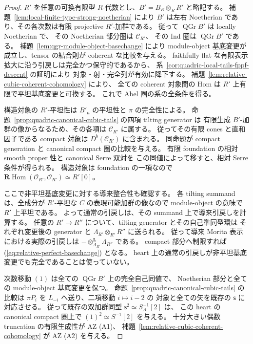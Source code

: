 \begin{proof}
$R'$ を任意の可換有限型 $R$-代数とし、$B'=B_R\otimes_RR'$ と略記する。
補題~\ref{lem:local-finite-type-strong-noetherian} により
$B'$ は左右 Noetherian であり、その各次数は有限 projective $R'$-加群である。
従って $\operatorname{QGr}B'$ は locally Noetherian で、
その Noetherian 部分圏は $\mathcal C_{R'}$、
その Ind 圏は $\operatorname{QGr}B'$ である。
補題~\ref{lem:qgr-module-object-basechange} により
module-object 基底変更が成立し、tensor の結合則が coherent な比較を与える。
faithfully flat な有限表示拡大に沿う引戻しは完全かつ保守的であるから、
系~\ref{cor:quadric-local-tails-fppf-descent} の証明により
対象・射・完全列が有効に降下する。
補題~\ref{lem:relative-cubic-coherent-cohomology} により、
全ての coherent 対象間の Hom は $R'$ 上有限で平坦基底変更と可換する。
これで Abel 圏の系の全条件を得る。

構造対象の $R'$-平坦性は $B'_n$ の平坦性と $\pi$ の完全性による。
命題~\ref{prop:quadric-canonical-cubic-tails} の四項 tilting generator は
有限生成 $B'$-加群の像からなるため、その各項は $\mathcal C_{R'}$ に属する。
従ってその有限 cones と直和因子である compact 対象は
$D^b(\mathcal C_{R'})$ に含まれる。
同命題が compact generation と canonical compact 圏の比較を与える。
有限 foundation の相対 smooth proper 性と canonical Serre 双対を
この同値によって移すと、相対 Serre 条件が得られる。
構造対象は foundation の一項なので
$\mathbf R\operatorname{Hom}(\mathcal O_{R'},\mathcal O_{R'})\simeq R'[0]$。

ここで非平坦基底変更に対する導来整合性も確認する。
各 tilting summand は、全成分が $R'$-平坦な $C$ の表現可能加群の像なので
module-object の意味で $R'$ 上平坦である。
よって通常の引戻しは、その summand 上で導来引戻しを計算する。
任意の $R'\to R''$ について、tilting generator とその自己準同型環は
それぞれ変更後の generator と $\Lambda_{R'}\otimes_{R'}R''$ に送られる。
従って導来 Morita 表示における実際の引戻しは
$-\otimes_{\Lambda_{R'}}^{\mathbf L}\Lambda_{R''}$ である。
compact 部分へ制限すれば (\ref{eq:relative-perfect-basechange}) となる。
heart 上の通常の引戻しが非平坦基底変更でも完全であることは使っていない。

次数移動 $(1)$ は全ての $\operatorname{QGr}B'$ 上の完全自己同値で、
Noetherian 部分と全ての module-object 基底変更を保つ。
命題~\ref{prop:quadric-canonical-cubic-tails} の比較は
$\pi P_i$ を $L_{-i}$ へ送り、二項移動 $i\mapsto i-2$ の
対象と全ての矢を既存の $\mathsf s$ に対応させる。
従って既存の双加群同型
$\mathsf s^2\simeq S_\Lambda^{-1}[2]$ は、
この heart の canonical compact 圏上で
$(1)^2\simeq S^{-1}[2]$ を与える。
十分大きい偶数 truncation の有限生成性が AZ (A1)、
補題~\ref{lem:relative-cubic-coherent-cohomology} が AZ (A2) を与える。


\end{proof}
